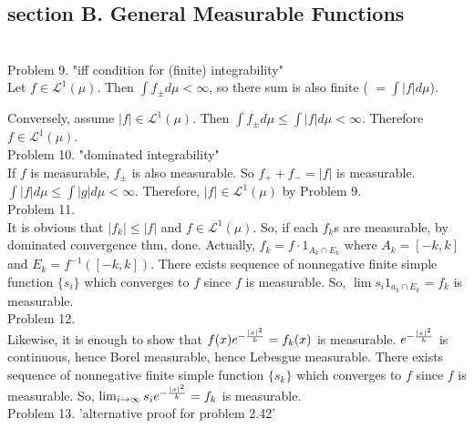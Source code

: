 \subsection*{section B. General Measurable Functions}\hfill \\

Problem 9. "iff condition for (finite) integrability"\\

Let $f\in \mathcal{L}^1(\mu)$. Then $\int f_{\pm} d\mu < \infty$, so there sum is also finite ( $= \int \lvert f \rvert d\mu$).

Conversely, assume $\lvert f \rvert \in \mathcal{L}^1(\mu)$. Then $\int f_{\pm} d\mu \leq \int \lvert f \rvert d\mu < \infty$. Therefore $f \in \mathcal{L}^1(\mu)$.\\

Problem 10. "dominated integrability"\\

If $f$ is measurable, $f_{\pm}$ is also measurable. So $f_+ + f_- = \lvert f \rvert $ is measurable.
$\int \lvert f \rvert d\mu \leq \int \lvert g \rvert d\mu < \infty$. 
Therefore, $\lvert f \rvert \in \mathcal{L}^1(\mu)$ by Problem 9.\\

Problem 11. \\

It is obvious that $ \lvert f_k \rvert \leq \lvert f \rvert$ and $f \in \mathcal{L}^1(\mu)$.
So, if each $f_k$s are measurable, by dominated convergence thm, done.
Actually, $f_k = f \cdot 1_{A_k \cap E_k}$ where $A_k = \left [ -k, k \right ]$ and $E_k = f^{-1} (\left [ -k, k \right])$.
There exists sequence of nonnegative finite simple function $\{s_i\}$ which converges to $f$ since $f$ is measurable.
So, $\lim s_i 1_{a_k \cap E_k} = f_k$ is measurable.\\

Problem 12. \\

Likewise, it is enough to show that $f(x) e^{-{ {\lvert x \rvert}^2 \over k}} = f_k(x)$ is measurable.
$e^{-{ {\lvert x \rvert}^2 \over k}}$ is continuous, hence Borel measurable, hence Lebesgue measurable.
There exists sequence of nonnegative finite simple function $\{s_k \}$ which converges to $f$ since $f$ is measurable.
So, $\lim_{i \rightarrow \infty} s_i e^{-{ {\lvert x \rvert}^2 \over k}} = f_k$ is measurable. \\

Problem 13. 'alternative proof for problem 2.42' \\

